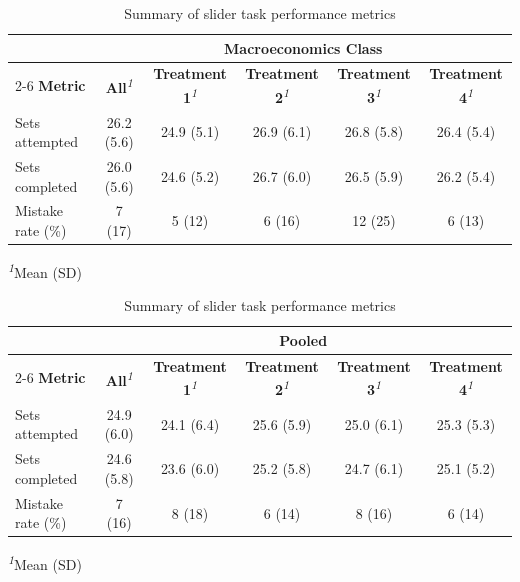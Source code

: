 \documentclass[
  12,
  letterpaper,
  DIV=11,
  numbers=noendperiod]{scrartcl}
\begin{document}
\begin{table}
{\fontsize{12.0pt}{14.0pt}\selectfont
\begin{tabular*}{\linewidth}{@{\extracolsep{\fill}}lccccc}
\toprule
 & \multicolumn{5}{c}{\textbf{Macroeconomics Class}} \\ 
\cmidrule(lr){2-6}
\textbf{Metric} & \textbf{All}\textsuperscript{\textit{1}} & \textbf{Treatment 1}\textsuperscript{\textit{1}} & \textbf{Treatment 2}\textsuperscript{\textit{1}} & \textbf{Treatment 3}\textsuperscript{\textit{1}} & \textbf{Treatment 4}\textsuperscript{\textit{1}} \\ 
\midrule\addlinespace[2.5pt]
Sets attempted & 26.2 (5.6) & 24.9 (5.1) & 26.9 (6.1) & 26.8 (5.8) & 26.4 (5.4) \\ 
Sets completed & 26.0 (5.6) & 24.6 (5.2) & 26.7 (6.0) & 26.5 (5.9) & 26.2 (5.4) \\ 
Mistake rate (\%) & 7 (17) & 5 (12) & 6 (16) & 12 (25) & 6 (13) \\ 
\bottomrule
\end{tabular*}
\begin{minipage}{\linewidth}
\textsuperscript{\textit{1}}Mean (SD)\\
\end{minipage}

\fontsize{12.0pt}{14.0pt}\selectfont
\begin{tabular*}{\linewidth}{@{\extracolsep{\fill}}lccccc}
\toprule
 & \multicolumn{5}{c}{\textbf{Pooled}} \\ 
\cmidrule(lr){2-6}
\textbf{Metric} & \textbf{All}\textsuperscript{\textit{1}} & \textbf{Treatment 1}\textsuperscript{\textit{1}} & \textbf{Treatment 2}\textsuperscript{\textit{1}} & \textbf{Treatment 3}\textsuperscript{\textit{1}} & \textbf{Treatment 4}\textsuperscript{\textit{1}} \\ 
\midrule\addlinespace[2.5pt]
Sets attempted & 24.9 (6.0) & 24.1 (6.4) & 25.6 (5.9) & 25.0 (6.1) & 25.3 (5.3) \\ 
Sets completed & 24.6 (5.8) & 23.6 (6.0) & 25.2 (5.8) & 24.7 (6.1) & 25.1 (5.2) \\ 
Mistake rate (\%) & 7 (16) & 8 (18) & 6 (14) & 8 (16) & 6 (14) \\ 
\bottomrule
\end{tabular*}
\begin{minipage}{\linewidth}
\textsuperscript{\textit{1}}Mean (SD)\\
\end{minipage}

}

\caption{\label{tbl-slider-performance-sumstats}Summary of slider task
performance metrics}

\end{table}%
\end{document}
